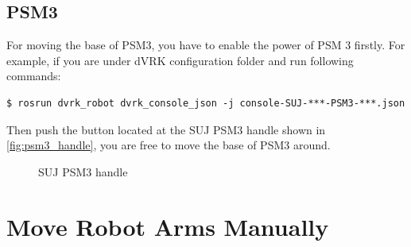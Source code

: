 \subsection{PSM3}

For moving the base of PSM3, you have to enable the power of PSM 3 firstly. For example, if you are under dVRK configuration folder and run following commands: 

\begin{verbatim}
$ rosrun dvrk_robot dvrk_console_json -j console-SUJ-***-PSM3-***.json
\end{verbatim}

Then push the button located at the SUJ PSM3 handle shown in \autoref{fig:psm3_handle}, you are free to move the base of PSM3 around.

\begin{figure}[H]
\centering
{}
\hfil
{}
\caption{SUJ PSM3 handle}
\label{fig:psm3_handle}
\end{figure}

\section{Move Robot Arms Manually}

